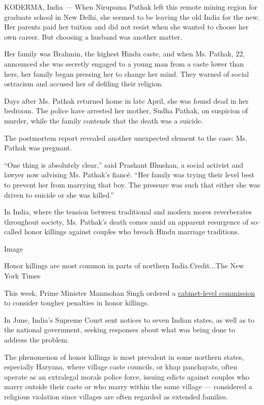 KODERMA, India --- When Nirupama Pathak left this remote mining region
for graduate school in New Delhi, she seemed to be leaving the old India
for the new. Her parents paid her tuition and did not resist when she
wanted to choose her own career. But choosing a husband was another
matter.

Her family was Brahmin, the highest Hindu caste, and when Ms. Pathak,
22, announced she was secretly engaged to a young man from a caste lower
than hers, her family began pressing her to change her mind. They warned
of social ostracism and accused her of defiling their religion.

Days after Ms. Pathak returned home in late April, she was found dead in
her bedroom. The police have arrested her mother, Sudha Pathak, on
suspicion of murder, while the family contends that the death was a
suicide.

The postmortem report revealed another unexpected element to the case:
Ms. Pathak was pregnant.

``One thing is absolutely clear,'' said Prashant Bhushan, a social
activist and lawyer now advising Ms. Pathak's fiancé. ``Her family was
trying their level best to prevent her from marrying that boy. The
pressure was such that either she was driven to suicide or she was
killed.''

In India, where the tension between traditional and modern mores
reverberates throughout society, Ms. Pathak's death comes amid an
apparent resurgence of so-called honor killings against couples who
breach Hindu marriage traditions.

Image

Honor killings are most common in parts of northern India.Credit...The
New York Times

This week, Prime Minister Manmohan Singh ordered a
\href{http://timesofindia.indiatimes.com/india/Cabinet-sends-bill-on-khaps-to-GoM/articleshow/6144531.cms}{cabinet-level
commission} to consider tougher penalties in honor killings.

In June, India's Supreme Court sent notices to seven Indian states, as
well as to the national government, seeking responses about what was
being done to address the problem.

The phenomenon of honor killings is most prevalent in some northern
states, especially Haryana, where village caste councils, or khap
panchayats, often operate as an extralegal morals police force, issuing
edicts against couples who marry outside their caste or who marry within
the same village --- considered a religious violation since villages are
often regarded as extended families.

